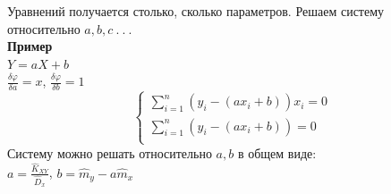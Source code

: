 \documentclass[russian, 12pt, fleqn]{article}
\begin{document}
Уравнений получается столько, сколько параметров. Решаем систему относительно $a, b, c\ .\ .\ . $\\
\textbf{Пример} \\
$Y=aX+b$\\
$\frac{\delta \varphi}{\delta a} = x$, $\frac{\delta \varphi}{\delta b} = 1$ \\
\begin{equation*} 
 \begin{cases}
   \displaystyle{\sum \limits_{i = 1}^{n}} (y_i -  (ax_i + b) )x_i = 0 \\
   \displaystyle{\sum \limits_{i = 1}^{n}} (y_i -  (ax_i + b) ) = 0 \\
 \end{cases}
\end{equation*}
Систему можно решать относительно $a, b$ в общем виде:\\
$a = \frac{\hat{K}_{XY}}{\hat{D}_x}$, $b = \hat{m}_y - a \hat{m}_x$\\
\end{document}
